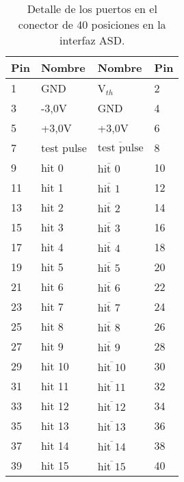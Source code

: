 \begin{table}[]
	\centering
	\caption{Detalle de los puertos en el conector de 40 posiciones en la interfaz ASD.}
	\begin{tabular}{@{}llll@{}}
		\toprule
		\textbf{Pin} & \textbf{Nombre} & \textbf{Nombre}                & \textbf{Pin} \\ \midrule
		1            & GND             & V$_{th}$                       & 2            \\
		3            & -3,0V           & GND                            & 4            \\
		5            & +3,0V           & +3,0V                          & 6            \\
		7            & test pulse      & $\overline{\mbox{test pulse}}$ & 8            \\
		9            & hit 0           & $\overline{\mbox{hit 0}}$      & 10           \\
		11           & hit 1           & $\overline{\mbox{hit 1}}$      & 12           \\
		13           & hit 2           & $\overline{\mbox{hit 2}}$      & 14           \\
		15           & hit 3           & $\overline{\mbox{hit 3}}$      & 16           \\
		17           & hit 4           & $\overline{\mbox{hit 4}}$      & 18           \\
		19           & hit 5           & $\overline{\mbox{hit 5}}$      & 20           \\
		21           & hit 6           & $\overline{\mbox{hit 6}}$      & 22           \\
		23           & hit 7           & $\overline{\mbox{hit 7}}$      & 24           \\
		25           & hit 8           & $\overline{\mbox{hit 8}}$      & 26           \\
		27           & hit 9           & $\overline{\mbox{hit 9}}$      & 28           \\
		29           & hit 10          & $\overline{\mbox{hit 10}}$     & 30           \\
		31           & hit 11          & $\overline{\mbox{hit 11}}$     & 32           \\
		33           & hit 12          & $\overline{\mbox{hit 12}}$     & 34           \\
		35           & hit 13          & $\overline{\mbox{hit 13}}$     & 36           \\
		37           & hit 14          & $\overline{\mbox{hit 14}}$     & 38           \\
		39           & hit 15          & $\overline{\mbox{hit 15}}$     & 40           \\ \bottomrule
	\end{tabular}
	\label{tab:asd-ports}
\end{table}


